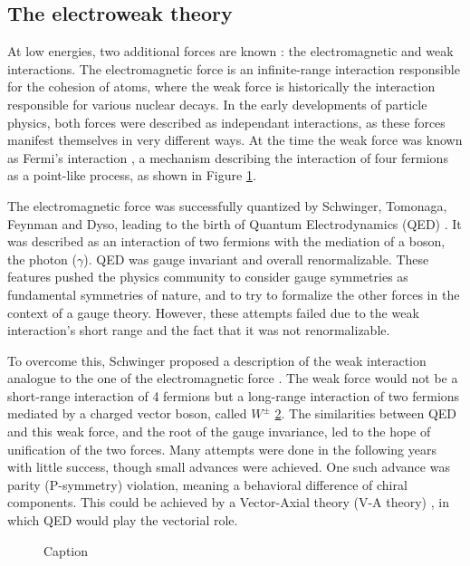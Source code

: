 \subsection{The electroweak theory}

At low energies, two additional forces are known : the electromagnetic and weak interactions. The electromagnetic force is an infinite-range interaction responsible for the cohesion of atoms, where the weak force is historically the interaction responsible for various nuclear decays. In the early developments of particle physics, both forces were described as independant interactions, as these forces manifest themselves in very different ways. At the time the weak force was known as Fermi's interaction \cite{Fermi2008}, a mechanism describing the interaction of four fermions as a point-like process, as shown in Figure \ref{fig:fermi_int}.

The electromagnetic force was successfully quantized by Schwinger, Tomonaga, Feynman and Dyso, leading to the birth of Quantum Electrodynamics (QED) \cite{PhysRev.80.440,PhysRev.76.749,PhysRev.76.769,PhysRev.74.1439,PhysRev.73.416,10.1143/PTP.1.27} . It was described as an interaction of two fermions with the mediation of a boson, the photon ($\gamma$). QED was gauge invariant and overall renormalizable. These features pushed the physics community to consider gauge symmetries as fundamental symmetries of nature, and to try to formalize the other forces in the context of a gauge theory. However, these attempts failed due to the weak interaction's short range and the fact that it was not renormalizable.

To overcome this, Schwinger proposed a description of the weak interaction analogue to the one of the electromagnetic force \cite{SCHWINGER1957407}. The weak force would not be a short-range interaction of 4 fermions but a long-range interaction of two fermions mediated by a charged vector boson, called $W^{\pm}$ \ref{fig:melectroweak}. The similarities between QED and this weak force, and the root of the gauge invariance, led to the hope of unification of the two forces. Many attempts were done in the following years with little success, though small advances were achieved. One such advance was parity (P-symmetry) violation, meaning a behavioral difference of chiral components. This could be achieved by a Vector-Axial theory (V-A theory) \cite{PhysRev.109.193,PhysRev.109.1860.2}, in which QED would play the vectorial role.

\begin{figure}
    \centering
    \begin{subfigure}{.5\textwidth}
    \label{fig:fermi_int}
    \centering
    
    \end{subfigure}
    \begin{subfigure}{.5\textwidth}
    \label{fig:melectroweak}
    \centering
    
    \end{subfigure}
    \caption{Caption}
    \label{fig:etomununu}
\end{figure}

